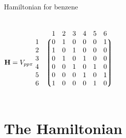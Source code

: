\documentclass[hyperref={colorlinks=true,urlcolor=blue,linkcolor=.},aspectratio=1610,mathserif]{beamer}
\begin{document}
\begin{frame}{Hamiltonian for benzene}
	\centering
	\begin{columns}[c]
		\begin{align}
	\mqty{                            \\ \\ \\ \vb{H} = V_{pp\pi}\\ \\ \\} \ \mqty{						&  \mqty{1 & 2 & 3 & 4 & 5 & 6} \\
		\mqty{1                           \\ 2 \\ 3 \\ 4 \\ 5 \\ 6} &	\mqty*(0 & 1 & 0 & 0 & 0 & 1 \\
	1 & 0 & 1 & 0 & 0 & 0             \\
	0 & 1 & 0 & 1 & 0 & 0             \\
	0 & 0 & 1 & 0 & 1 & 0             \\
	0 & 0 & 0 & 1 & 0 & 1             \\
	1 & 0 & 0 & 0 & 1 & 0)} \nonumber
\end{align}
	\end{columns}
\end{frame}

\section{The Hamiltonian}
\end{document}
